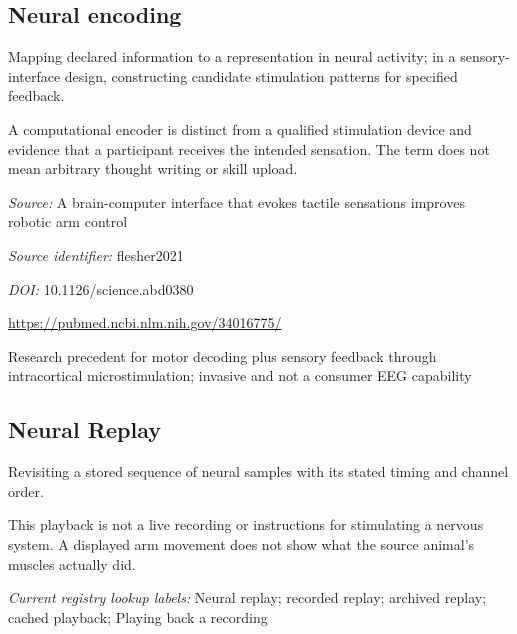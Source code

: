\begin{samepage}
\subsection*{Neural encoding}
\noindent Mapping declared information to a representation in neural activity; in a sensory-interface design, constructing candidate stimulation patterns for specified feedback.\par
\end{samepage}
\noindent A computational encoder is distinct from a qualified stimulation device and evidence that a participant receives the intended sensation. The term does not mean arbitrary thought writing or skill upload.\par



\noindent\textit{Source:} A brain-computer interface that evokes tactile sensations improves robotic arm control\par
\noindent\textit{Source identifier:} flesher2021\par
\noindent\textit{DOI:} 10.1126/science.abd0380\par
\noindent\url{https://pubmed.ncbi.nlm.nih.gov/34016775/}\par
\noindent Research precedent for motor decoding plus sensory feedback through intracortical microstimulation; invasive and not a consumer EEG capability\par

\begin{samepage}
\subsection*{Neural Replay}
\noindent Revisiting a stored sequence of neural samples with its stated timing and channel order.\par
\end{samepage}
\begin{samepage}
\noindent This playback is not a live recording or instructions for stimulating a nervous system. A displayed arm movement does not show what the source animal’s muscles actually did.\par\nopagebreak[4]

\end{samepage}


\noindent\textit{Current registry lookup labels:} Neural replay; recorded replay; archived replay; cached playback; Playing back a recording\par

